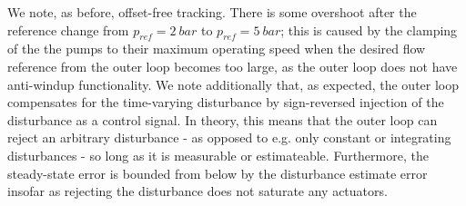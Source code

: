 We note, as before, offset-free tracking. There is some overshoot after the reference change from $p_{ref} = 2 \ \si{bar}$ to $p_{ref} = 5 \ \si{bar}$; this is caused by the clamping of the the pumps to their maximum operating speed when the desired flow reference from the outer loop becomes too large, as the outer loop does not have anti-windup functionality. We note additionally that, as expected, the outer loop compensates for the time-varying disturbance by sign-reversed injection of the disturbance as a control signal. In theory, this means that the outer loop can reject an arbitrary disturbance - as opposed to e.g. only constant or integrating disturbances - so long as it is measurable or estimateable. Furthermore, the steady-state error is bounded from below by the disturbance estimate error insofar as rejecting the disturbance does not saturate any actuators.




